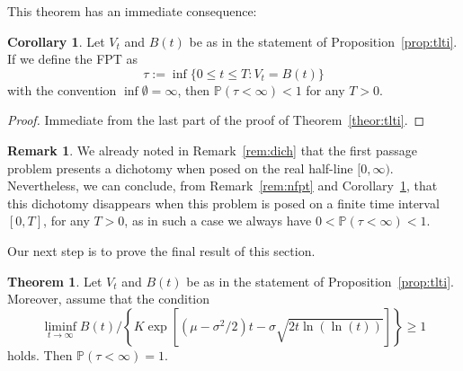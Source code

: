 \documentclass[12pt]{article}
\theoremstyle{definition}
\newtheorem{theorem}{Theorem}
\newtheorem{corollary}{Corollary}[theorem]
\newtheorem{remark}{Remark}[theorem]
\begin{document}
This theorem has an immediate consequence:

\begin{corollary}\label{cor:nfpt}
Let $V_t$ and $B(t)$ be as in the statement of Proposition~\ref{prop:tlti}. If we define the FPT as
$$
\tau := \inf \{0 \le t \le T : V_t = B(t)\}
$$
with the convention $\inf \emptyset = \infty$, then $\mathbb{P}(\tau < \infty) < 1$ for any $T>0$.
\end{corollary}

\begin{proof}
Immediate from the last part of the proof of Theorem~\ref{theor:tlti}.
\end{proof}

\begin{remark}\label{rem:cornfpt}
We already noted in Remark~\ref{rem:dich} that the first passage problem presents a dichotomy when posed on the real half-line $[0,\infty)$. Nevertheless, we can conclude, from Remark~\ref{rem:nfpt} and Corollary~\ref{cor:nfpt}, that this dichotomy disappears when this problem is posed on a finite time interval $[0,T]$, for any $T>0$, as in such a case we always have 
$
0 < \mathbb{P}(\tau < \infty) < 1.
$
\end{remark}

Our next step is to prove the final result of this section.

\begin{theorem}\label{theor:maincb}
Let $V_t$ and $B(t)$ be as in the statement of Proposition~\ref{prop:tlti}. Moreover, assume that the condition
$$
\liminf_{t \to \infty} B(t) \Big/ \left\{ K \exp \left[(\mu-\sigma^2/2)t - \sigma \sqrt{2t \ln(\ln(t))}\right] \right\} \ge 1
$$
holds. Then $\mathbb{P}(\tau < \infty) = 1$.
\end{theorem}
\end{document}
